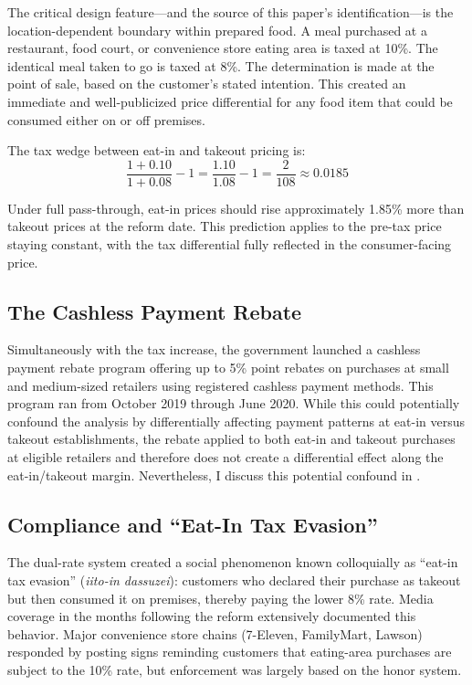 \documentclass[12pt]{article}
\begin{document}
The critical design feature---and the source of this paper's identification---is the location-dependent boundary within prepared food. A meal purchased at a restaurant, food court, or convenience store eating area is taxed at 10\%. The identical meal taken to go is taxed at 8\%. The determination is made at the point of sale, based on the customer's stated intention. This created an immediate and well-publicized price differential for any food item that could be consumed either on or off premises.

The tax wedge between eat-in and takeout pricing is:
\begin{equation}
\frac{1 + 0.10}{1 + 0.08} - 1 = \frac{1.10}{1.08} - 1 = \frac{2}{108} \approx 0.0185
\label{eq:wedge}
\end{equation}

Under full pass-through, eat-in prices should rise approximately 1.85\% more than takeout prices at the reform date. This prediction applies to the pre-tax price staying constant, with the tax differential fully reflected in the consumer-facing price.

\subsection{The Cashless Payment Rebate}

Simultaneously with the tax increase, the government launched a cashless payment rebate program offering up to 5\% point rebates on purchases at small and medium-sized retailers using registered cashless payment methods. This program ran from October 2019 through June 2020. While this could potentially confound the analysis by differentially affecting payment patterns at eat-in versus takeout establishments, the rebate applied to both eat-in and takeout purchases at eligible retailers and therefore does not create a differential effect along the eat-in/takeout margin. Nevertheless, I discuss this potential confound in .

\subsection{Compliance and ``Eat-In Tax Evasion''}

The dual-rate system created a social phenomenon known colloquially as ``eat-in tax evasion'' (\textit{iito-in dassuzei}): customers who declared their purchase as takeout but then consumed it on premises, thereby paying the lower 8\% rate. Media coverage in the months following the reform extensively documented this behavior. Major convenience store chains (7-Eleven, FamilyMart, Lawson) responded by posting signs reminding customers that eating-area purchases are subject to the 10\% rate, but enforcement was largely based on the honor system.
\end{document}
